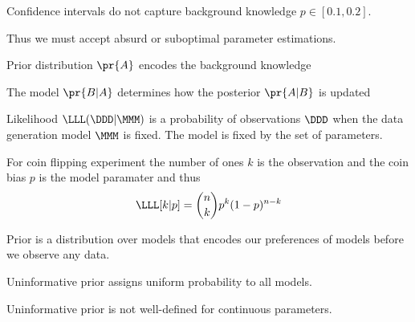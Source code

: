 \documentclass[landscape,footrule]{foils}
\begin{document}
\titlefoil







\begin{triangles}
\item Confidence intervals do not capture background knowledge $p\in[0.1,0.2]$. 
\item Thus we must accept absurd or suboptimal parameter estimations. 
\end{triangles}




\vspace*{1cm}
\begin{triangles}
\item Prior distribution $\pr{A}$ encodes the background knowledge
\item The model $\pr{B|A}$  determines how the posterior $\pr{A|B}$ is updated 
\end{triangles}


Likelihood $\LLL(\DDD|\MMM)$ is a probability of observations $\DDD$ when the data generation model $\MMM$ is fixed.
The model is fixed by the set of parameters.

For coin flipping experiment the number of ones $k$ is the observation and the coin bias $p$ is the model paramater and thus
\begin{align*}
\LLL[k|p]=\binom{n}{k}p^k(1-p)^{n-k}
\end{align*}

Prior is a distribution over models that encodes our preferences of models before we observe any data.
\begin{triangles}
\item Uninformative prior assigns uniform probability to all models.
\item Uninformative prior is not well-defined for continuous parameters.  
\end{triangles}
   


\vspace*{-0.5cm}
\end{document}
